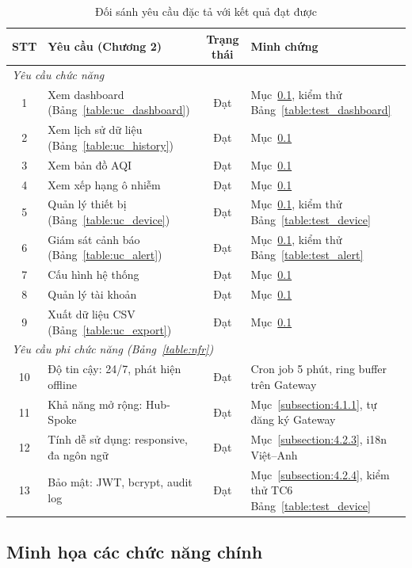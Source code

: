 \documentclass[../DoAn.tex]{subfiles}
\begin{document}
\begin{table}[H]
\centering
\caption{Đối sánh yêu cầu đặc tả với kết quả đạt được}
\label{table:req_mapping}
\small
\begin{tabularx}{\textwidth}{|c|X|c|X|}
\hline
\textbf{STT} & \textbf{Yêu cầu (Chương 2)} & \textbf{Trạng thái} & \textbf{Minh chứng} \\
\hline
\multicolumn{4}{|l|}{\textit{Yêu cầu chức năng}} \\
\hline
1 & Xem dashboard (Bảng~\ref{table:uc_dashboard}) & Đạt & Mục~\ref{subsection:4.3.3}, kiểm thử Bảng~\ref{table:test_dashboard} \\
\hline
2 & Xem lịch sử dữ liệu (Bảng~\ref{table:uc_history}) & Đạt & Mục~\ref{subsection:4.3.3} \\
\hline
3 & Xem bản đồ AQI & Đạt & Mục~\ref{subsection:4.3.3} \\
\hline
4 & Xem xếp hạng ô nhiễm & Đạt & Mục~\ref{subsection:4.3.3} \\
\hline
5 & Quản lý thiết bị (Bảng~\ref{table:uc_device}) & Đạt & Mục~\ref{subsection:4.3.3}, kiểm thử Bảng~\ref{table:test_device} \\
\hline
6 & Giám sát cảnh báo (Bảng~\ref{table:uc_alert}) & Đạt & Mục~\ref{subsection:4.3.3}, kiểm thử Bảng~\ref{table:test_alert} \\
\hline
7 & Cấu hình hệ thống & Đạt & Mục~\ref{subsection:4.3.3} \\
\hline
8 & Quản lý tài khoản & Đạt & Mục~\ref{subsection:4.3.3} \\
\hline
9 & Xuất dữ liệu CSV (Bảng~\ref{table:uc_export}) & Đạt & Mục~\ref{subsection:4.3.3} \\
\hline
\multicolumn{4}{|l|}{\textit{Yêu cầu phi chức năng (Bảng~\ref{table:nfr})}} \\
\hline
10 & Độ tin cậy: 24/7, phát hiện offline & Đạt & Cron job 5 phút, ring buffer trên Gateway \\
\hline
11 & Khả năng mở rộng: Hub-Spoke & Đạt & Mục~\ref{subsection:4.1.1}, tự đăng ký Gateway \\
\hline
12 & Tính dễ sử dụng: responsive, đa ngôn ngữ & Đạt & Mục~\ref{subsection:4.2.3}, i18n Việt--Anh \\
\hline
13 & Bảo mật: JWT, bcrypt, audit log & Đạt & Mục~\ref{subsection:4.2.4}, kiểm thử TC6 Bảng~\ref{table:test_device} \\
\hline
\end{tabularx}
\end{table}

\subsection{Minh họa các chức năng chính}
\label{subsection:4.3.3}
\end{document}
